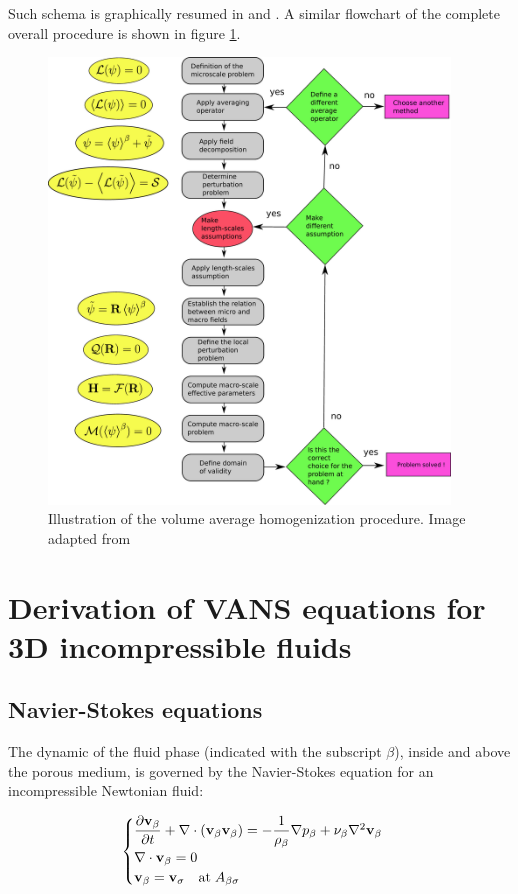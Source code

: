 Such schema is graphically resumed in \citet{paez2017macroscopic} and \citet{davit2013homogenization}. A similar flowchart of the complete overall procedure is shown in figure \ref{fig:schema_vans_homo}.

\begin{figure}[h!]
	\centering
	\includegraphics[width=0.95\textwidth,height=0.95\textheight,keepaspectratio]{chapter_2/figure/schema}
	\caption{Illustration of the volume average homogenization procedure. Image adapted from \citet{davit2013homogenization}}
	\label{fig:schema_vans_homo}
\end{figure}

\section{Derivation of VANS equations for 3D incompressible fluids}
\subsection{Navier-Stokes equations}
The dynamic of the fluid phase (indicated with the subscript $\beta$), inside and above the porous medium, is governed by the Navier-Stokes equation for an incompressible Newtonian fluid:

\begin{eqnarray}
	\begin{cases}
		\dfrac{\partial \textbf{v}_{\beta}}{\partial t} +  \nabla \cdot (\textbf{v}_{\beta} \textbf{v}_{\beta})  = -\dfrac{1}{\rho_{\beta}} \nabla p_{\beta} + \nu_{\beta} \nabla^2  \textbf{v}_{\beta}  \\
		\nabla \cdot \textbf{v}_{\beta} = 0 \\
		\textbf{v}_{\beta} = \textbf{v}_{\sigma} \quad \text{at} \; A_{\beta\sigma}
	\end{cases}
\label{eq:NS}
\end{eqnarray}\\


